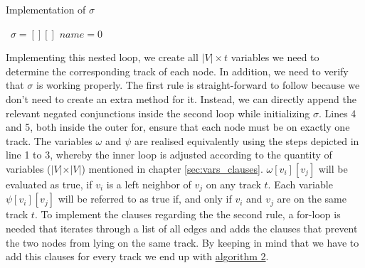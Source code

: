 \documentclass[bachelor, english]{algothesis}
\begin{document}
\begin{algorithm}[ht]
    \caption{Implementation of $\sigma$}
    \label{alg:sigma}
        $\, \, \, \sigma = [][]$ \newline
        $name = 0$ \newline
\end{algorithm}
\noindent
Implementing this nested loop, we create all $ \vert V \vert \times t$ variables we need to determine the corresponding track of each node. In addition, we need to verify that $\sigma$ is working properly. The first rule is straight-forward to follow because we don't need to create an extra method for it. Instead, we can directly append the relevant negated conjunctions inside the second loop while initializing $\sigma$. Lines 4 and 5, both inside the outer for, ensure that each node must be on exactly one track. The variables $\omega$ and $\psi$ are realised equivalently using the steps depicted in line 1 to 3, whereby the inner loop is adjusted according to the quantity of variables ($ \vert V \vert \times \vert V \vert$) mentioned in chapter \ref{sec:vars_clauses}. $\omega[v_i][v_j]$ will be evaluated as true, if $v_i$ is a left neighbor of $v_j$ on any track $t$. Each variable $\psi[v_i][v_j]$ will be referred to as true if, and only if $v_i$ and $v_j$ are on the same track $t$. To implement the clauses regarding the the second rule, a for-loop is needed that iterates through a list of all edges and adds the clauses that prevent the two nodes from lying on the same track. By keeping in mind that we have to add this clauses for every track we end up with \hyperlink{alg:second_rule}{algorithm 2}.
\end{document}
